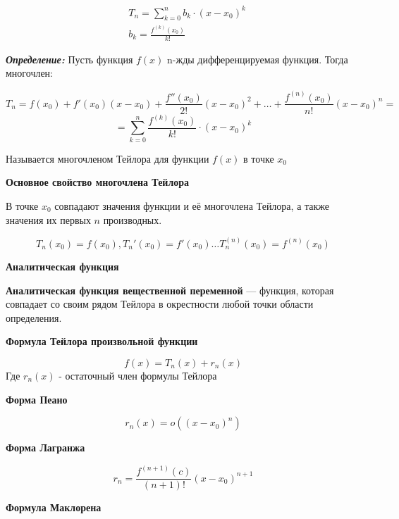\documentclass[a4paper,12pt]{article}
\theoremstyle{plain} %
\theoremstyle{definition} %
\theoremstyle{remark} %
\begin{document}
\begin{equation*}
	\begin{aligned}
		 & T_n = \sum_{k=0}^n b_k \cdot (x - x_0)^k \\
		 & b_k = \frac{f^{(k)}(x_0)}{k!}
	\end{aligned}
\end{equation*}

\textbf{\textit{Определение:}}
Пусть функция $f(x)$ n-жды дифференцируемая функция.
Тогда многочлен:

\[
	T_n = f(x_0) + f'(x_0)(x-x_0) + \frac{f''(x_0)}{2!}(x-x_0)^2 + \dots + \frac{f^{(n)}(x_0)}{n!}(x-x_0)^n = \] \[ = \sum_{k=0}^n \frac{f^{(k)}(x_0)}{k!} \cdot (x - x_0)^k
\]

Называется многочленом Тейлора для функции $f(x)$ в точке $x_0$


\begin{center}
	\textbf{Основное свойство многочлена Тейлора}
\end{center}

В точке $x_0$ совпадают значения функции и её многочлена Тейлора, а также значения их первых $n$ производных.

\[
	T_n(x_0) = f(x_0), T_n'(x_0) = f'(x_0) \dots T_n^{(n)}(x_0) = f^{(n)}(x_0)
\]

\begin{center}
	\textbf{Аналитическая функция}
\end{center}

\textbf{Аналитическая функция вещественной переменной} — функция, которая совпадает со своим рядом Тейлора в окрестности любой точки области определения.

\begin{center}
	\textbf{Формула Тейлора произвольной функции}
\end{center}

\[ f(x) = T_n(x) + r_n(x) \]
Где $r_n(x)$ - остаточный член формулы Тейлора

\begin{center}
	\textbf{Форма Пеано}
\end{center}

\[ r_n(x) = o((x-x_0)^n) \]

\begin{center}
	\textbf{Форма Лагранжа}
\end{center}

\[ r_n = \frac{f^{(n+1)}(c)}{(n+1)!}(x-x_0)^{n+1} \]

\begin{center}
	\textbf{Формула Маклорена}
\end{center}
\end{document}

